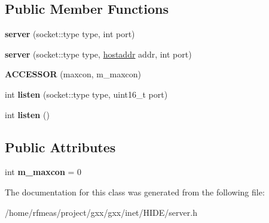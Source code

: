 \subsection*{Public Member Functions}
\begin{DoxyCompactItemize}
\item 
{\bfseries server} (socket\+::type type, int port)\hypertarget{classgxx_1_1server_ab2ea50b6e7c62843d0ddcac10329f2c0}{}\label{classgxx_1_1server_ab2ea50b6e7c62843d0ddcac10329f2c0}

\item 
{\bfseries server} (socket\+::type type, \hyperlink{classgxx_1_1hostaddr}{hostaddr} addr, int port)\hypertarget{classgxx_1_1server_a66adb3fb28136d964eff73037d75c218}{}\label{classgxx_1_1server_a66adb3fb28136d964eff73037d75c218}

\item 
{\bfseries A\+C\+C\+E\+S\+S\+OR} (maxcon, m\+\_\+maxcon)\hypertarget{classgxx_1_1server_a26a3c3fc5848d15c31a3f85682be973f}{}\label{classgxx_1_1server_a26a3c3fc5848d15c31a3f85682be973f}

\item 
int {\bfseries listen} (socket\+::type type, uint16\+\_\+t port)\hypertarget{classgxx_1_1server_a9fb7346211f29233ac15bbfd680139b6}{}\label{classgxx_1_1server_a9fb7346211f29233ac15bbfd680139b6}

\item 
int {\bfseries listen} ()\hypertarget{classgxx_1_1server_a8c6e660a1506e2a040d8fb09eae07618}{}\label{classgxx_1_1server_a8c6e660a1506e2a040d8fb09eae07618}

\end{DoxyCompactItemize}
\subsection*{Public Attributes}
\begin{DoxyCompactItemize}
\item 
int {\bfseries m\+\_\+maxcon} = 0\hypertarget{classgxx_1_1server_a3696a8e6134e63ac6f0f98425b9ed0c1}{}\label{classgxx_1_1server_a3696a8e6134e63ac6f0f98425b9ed0c1}

\end{DoxyCompactItemize}


The documentation for this class was generated from the following file\+:\begin{DoxyCompactItemize}
\item 
/home/rfmeas/project/gxx/gxx/inet/\+H\+I\+D\+E/server.\+h\end{DoxyCompactItemize}
